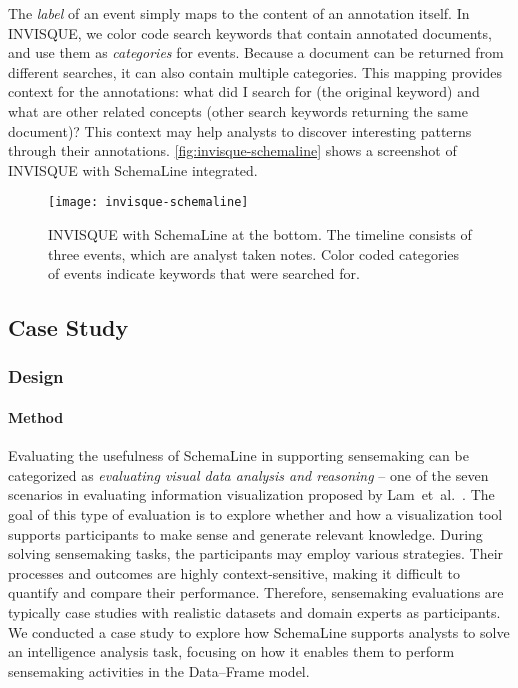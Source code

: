 The \emph{label} of an event simply maps to the content of an annotation itself. In INVISQUE, we color code search keywords that contain annotated documents, and use them as \emph{categories} for events. Because a document can be returned from different searches, it can also contain multiple categories. This mapping provides context for the annotations: what did I search for (the original keyword) and what are other related concepts (other search keywords returning the same document)? This context may help analysts to discover interesting patterns through their annotations. \autoref{fig:invisque-schemaline} shows a screenshot of INVISQUE with SchemaLine integrated.

\begin{figure}[!htb]
	\centering
	\texttt{[image: invisque-schemaline]}
	\caption{INVISQUE with SchemaLine at the bottom. The timeline consists of three events, which are analyst taken notes. Color coded categories of events indicate keywords that were searched for.}
	\label{fig:invisque-schemaline}
\end{figure}

\subsection{Case Study}

\subsubsection{Design}

\paragraph{Method}
Evaluating the usefulness of SchemaLine in supporting sensemaking can be categorized as \emph{evaluating visual data analysis and reasoning} -- one of the seven scenarios in evaluating information visualization proposed by Lam~et~al.~\cite{Lam2012}. The goal of this type of evaluation is to explore whether and how a visualization tool supports participants to make sense and generate relevant knowledge. During solving sensemaking tasks, the participants may employ various strategies. Their processes and outcomes are highly context-sensitive, making it difficult to quantify and compare their performance. Therefore, sensemaking evaluations are typically case studies with realistic datasets and domain experts as participants. We conducted a case study to explore how SchemaLine supports analysts to solve an intelligence analysis task, focusing on how it enables them to perform sensemaking activities in the Data--Frame model.

